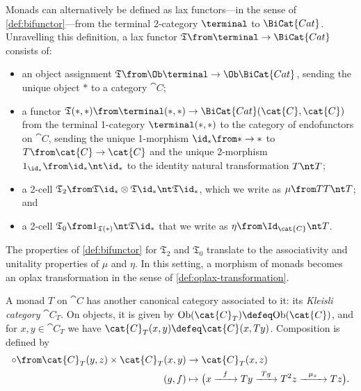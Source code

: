 \begin{example}\label{ex:alternative-monad}
  Monads can alternatively be defined as
  lax functors—in the sense of \cref{def:bifunctor}—from
  the terminal 2-category \(\terminal\) to \(\BiCat{Cat}\).
  Unravelling this definition,
  a lax functor \(\mathfrak{T} \from \terminal \to \BiCat{Cat}\) consists of:
  \begin{itemize}
    \item an object assignment \(\mathfrak{T}\from \Ob\terminal \to \Ob\BiCat{Cat}\),
    sending the unique object \(\ast\) to a category \(\cat{C}\);
    \item a functor \(\mathfrak{T}(*,*)\from \terminal(*,*) \to \BiCat{Cat}(\cat{C},\cat{C})\)
    from the terminal 1-category \(\terminal(*,*)\) to the category of endofunctors on \(\cat{C}\),
    sending the unique 1-morphism \(\id_{*}\from * \to *\) to \(T\from \cat{C}\to \cat{C}\)
    and the unique 2-morphism \(1_{\id_{*}}\from \id_{*} \nt \id_{*}\) to the identity natural transformation \(T \nt T\);
    \item a 2-cell
    \(\mathfrak{T}_2\from \mathfrak{T}\id_{*} \otimes \mathfrak{T}\id_{*} \nt \mathfrak{T}\id_{*}\),
    which we write as \(\mu\from T T \nt T\); and
    \item a 2-cell
    \(\mathfrak{T}_0\from 1_{\mathfrak{T}(*)} \nt \mathfrak{T}\id_{*}\)
    that we write as \(\eta \from \Id_{\cat{C}} \nt T\).
  \end{itemize}
  The properties of \cref{def:bifunctor} for \(\mathfrak{T}_2\) and \(\mathfrak{T}_0\)
  translate to the associativity and unitality properties of \(\mu\) and \(\eta\).
  In this setting,
  a morphism of monads becomes an oplax transformation in the sense of \cref{def:oplax-transformation}.
\end{example}

\begin{example}\label{ex:kleisli-category}
  A monad \(T\) on \(\cat{C}\) has another canonical category associated to it:
  its \emph{Kleisli category} \(\cat{C}_T\).
  On objects, it is given by \(\mathrm{Ob}(\cat{C}_T) \defeq \mathrm{Ob}(\cat{C})\),
  and for \(x, y \in \cat{C}_T\) we have \(\cat{C}_T(x,y) \defeq \cat{C}(x,Ty)\).
  Composition is defined by
  \begin{align*}
    \circ \from \cat{C}_T(y, z) \times \cat{C}_T(x, y) &\to \cat{C}_T(x, z) \\
    (g, f) &\mapsto \big( x \xrightarrow{\ \ f\ \ } Ty \xrightarrow{\ Tg\ } T^2z \xrightarrow{\ \ \mu_z\ \ } Tz \big).
  \end{align*}
\end{example}

